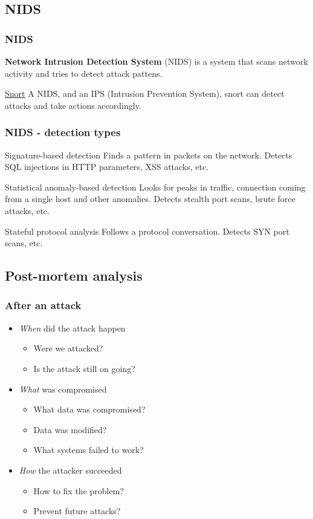 \subsection{NIDS}

\begin{frame}
\frametitle{NIDS}
\textbf{Network Intrusion Detection System} (NIDS) is a system that scans
network activity and tries to detect attack pattens.
\begin{exampleblock}{\href{http://www.snort.org/}{Snort}}
A NIDS, and an IPS (Intrusion Prevention System), snort can detect attacks and
take actions accordingly.
\end{exampleblock}
\end{frame}

\begin{frame}
\frametitle{NIDS - detection types}
\begin{block}{Signature-based detection}
Finds a pattern in packets on the network.
Detects SQL injections in HTTP parameters, XSS attacks, etc.
\end{block}
\begin{block}{Statistical anomaly-based detection}
Looks for peaks in traffic, connection coming from a single host and other
anomalies.
Detects stealth port scans, brute force attacks, etc.
\end{block}
\begin{block}{Stateful protocol analysis}
Follows a protocol conversation.
Detects SYN port scans, etc.
\end{block}
\end{frame}

\subsection{Post-mortem analysis}

\begin{frame}
\frametitle{After an attack}
\begin{itemize}
\item \emph{When} did the attack happen
	\begin{itemize}
	\item Were we attacked?
	\item Is the attack still on going?
	\end{itemize}
\item \emph{What} was compromised
	\begin{itemize}
	\item What data was compromised?
	\item Data was modified?
	\item What systems failed to work?
	\end{itemize}
\item \emph{How} the attacker succeeded
	\begin{itemize}
	\item How to fix the problem?
	\item Prevent future attacks?
	\end{itemize}
\end{itemize}
\end{frame}

